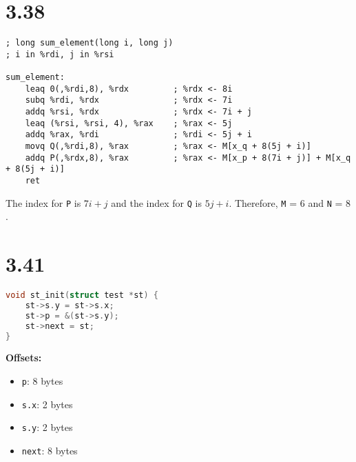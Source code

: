 \documentclass{article}
\begin{document}
\newpage
\section*{3.38}

\begin{lstlisting}[language=myassembly]
; long sum_element(long i, long j)
; i in %rdi, j in %rsi

sum_element:
    leaq 0(,%rdi,8), %rdx         ; %rdx <- 8i
    subq %rdi, %rdx               ; %rdx <- 7i
    addq %rsi, %rdx               ; %rdx <- 7i + j
    leaq (%rsi, %rsi, 4), %rax    ; %rax <- 5j
    addq %rax, %rdi               ; %rdi <- 5j + i
    movq Q(,%rdi,8), %rax         ; %rax <- M[x_q + 8(5j + i)]
    addq P(,%rdx,8), %rax         ; %rax <- M[x_p + 8(7i + j)] + M[x_q + 8(5j + i)]
    ret
\end{lstlisting}

\noindent The index for \texttt{P} is $7i + j$ and the index for \texttt{Q} is $5j + i$. Therefore, \texttt{M} = $6$ and \texttt{N} = $8$.

\section*{3.41}

\begin{lstlisting}[language=C]
void st_init(struct test *st) {
    st->s.y = st->s.x;
    st->p = &(st->s.y);
    st->next = st;
}
\end{lstlisting}

\vspace{1em}
\noindent\textbf{Offsets:}
\begin{itemize}
    \item \texttt{p}: 8 bytes
    \item \texttt{s.x}: 2 bytes
    \item \texttt{s.y}: 2 bytes
    \item \texttt{next}: 8 bytes
\end{itemize}
\end{document}
